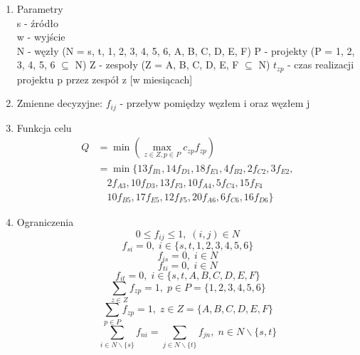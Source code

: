 \documentclass[12pt]{article}
\begin{document}
\begin{enumerate}
\item Parametry \\
s - źródło \\
w - wyjście \\
N - węzły (N = {s, t, 1, 2, 3, 4, 5, 6, A, B, C, D, E, F})
P - projekty (P = {1, 2, 3, 4, 5, 6} $\subseteq$ N)
Z - zespoły (Z = {A, B, C, D, E, F} $\subseteq$ N)
$t_{zp}$  - czas realizacji projektu p przez zespół z [w miesiącach]

\item Zmienne decyzyjne:
$f_{ij}$ - przeływ pomiędzy węzłem i oraz węzłem j
\item Funkcja celu
\begin{align*}
    Q &= \min \left( \max_{z \in Z, p \in P} c_{zp} f_{zp} \right) \\
    &= \min \big\{13f_{B1}, 14f_{D1}, 18f_{E1}, 4f_{B2}, 2f_{C2}, 3f_{E2}, \\
    &\quad  2f_{A3}, 10f_{D3},13f_{F3}, 10f_{A4}, 5f_{C4}, 15f_{F4} \\
    &\quad 10f_{B5}, 17f_{E5}, 12f_{F5}, 20f_{A6}, 6f_{C6}, 16f_{D6} \big\}
\end{align*}


\item Ograniczenia
\setcounter{equation}{0}
\begin{equation}
0 \leq f_{ij} \leq 1, \; (i, j) \in N
\end{equation}
\begin{equation}
f_{si} = 0, \; i \in \{ s, t, 1, 2, 3, 4, 5, 6 \}
\end{equation}
\begin{equation}
f_{is} = 0, \; i \in N
\end{equation}
\begin{equation}
f_{ti} = 0, \; i \in N
\end{equation}
\begin{equation}
f_{it} = 0, \; i \in \{s, t, A, B, C, D, E, F\}
\end{equation}
\begin{equation}
\sum_{z \in Z} f_{zp} = 1, \; p \in P = \{ 1, 2, 3, 4, 5, 6 \}
\end{equation} 
\begin{equation}
\sum_{p \in P} f_{zp} = 1, \; z \in Z = \{ A, B, C, D, E, F \}
\end{equation}
\begin{equation}
\sum_{i \in N \backslash \{s\}} f_{ni} = \sum_{j \in N \backslash \{t\}} f_{jn}, \; n \in N \backslash \{ s, t \}
\end{equation}

\end{enumerate}
\end{document}
